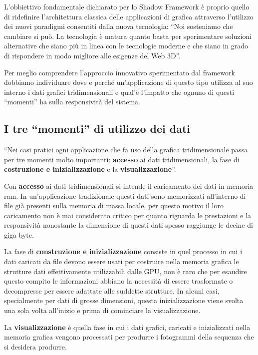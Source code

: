 L'obbiettivo fondamentale dichiarato per lo Shadow Framework \`e proprio quello di ridefinire l'architettura classica delle applicazioni di grafica attraverso l'utilizzo dei nuovi paradigmi consentiti dalla nuova tecnologia: ``Noi sosteniamo che cambiare si pu\`o. La tecnologia \`e matura quanto basta per sperimentare soluzioni alternative che siano pi\`u in linea con le tecnologie moderne e che siano in grado di rispondere in modo migliore alle esigenze del Web 3D''\cite{site:shadowframework}.

Per meglio comprendere l'approccio innovativo sperimentato dal framework dobbiamo individuare dove e perch\'e un'applicazione di questo tipo utilizza al suo interno i dati grafici tridimensionali e qual'\`e l'impatto che ognuno di questi ``momenti'' ha sulla responsivit\`a del sistema.

\subsection{I tre ``momenti'' di utilizzo dei dati}
``Nei casi pratici ogni applicazione che fa uso della grafica tridimensionale passa per tre momenti molto importanti: \textbf{accesso} ai dati tridimensionali, la fase di \textbf{costruzione e inizializzazione} e la \textbf{visualizzazione}''\cite{site:shadowframework}.

Con \textbf{accesso} ai dati tridimensionali si intende il caricamento dei dati in memoria ram. In un'applicazione tradizionale questi dati sono memorizzati all'interno di file gi\`a presenti sulla memoria di massa locale, per questo motivo il loro caricamento non \`e mai considerato critico per quanto riguarda le prestazioni e la responsivit\`a nonostante la dimensione di questi dati spesso raggiunge le decine di giga byte. 

La fase di \textbf{construzione e inizializzazione} consiste in quel processo in cui i dati caricati da file devono essere usati per costruire nella memoria grafica le strutture dati effettivamente utilizzabili dalle \ac{GPU}, non \`e raro che per esaudire questo compito le informazioni abbiano la necessit\`a di essere trasformate o decompresse per essere adattate alle suddette strutture.
In alcuni casi, specialmente per dati di grosse dimensioni, questa inizializzazione viene svolta una sola volta all'inizio e prima di cominciare la visualizzazione.

La \textbf{visualizzazione} \`e quella fase in cui i dati grafici, caricati e inizializzati nella memoria grafica vengono processati per produrre i fotogrammi della sequenza che si desidera produrre.

